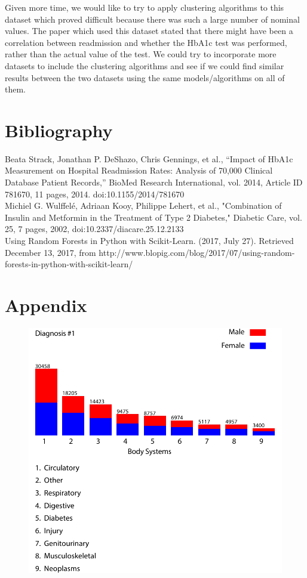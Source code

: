 \documentclass{neu_handout}
\begin{document}
Given more time, we would like to try to apply clustering algorithms to this dataset which proved difficult because there was such a large number of nominal values. The paper which used this dataset stated that there might have been a correlation between readmission and whether the HbA1c test was performed, rather than the actual value of the test. We could try to incorporate more datasets to include the clustering algorithms and see if we could find similar results between the two datasets using the same models/algorithms on all of them. 
\pagebreak

\section*{Bibliography}

Beata Strack, Jonathan P. DeShazo, Chris Gennings, et al., “Impact of HbA1c Measurement on Hospital Readmission Rates: Analysis of 70,000 Clinical Database Patient Records,” BioMed Research International, vol. 2014, Article ID 781670, 11 pages, 2014. doi:10.1155/2014/781670 \\

Michiel G. Wulffelé, Adriaan Kooy, Philippe Lehert, et al., "Combination of Insulin and Metformin in the Treatment of Type 2 Diabetes," Diabetic Care, vol. 25, 7 pages, 2002, doi:10.2337/diacare.25.12.2133 \\

Using Random Forests in Python with Scikit-Learn. (2017, July 27). Retrieved December 13, 2017, from http://www.blopig.com/blog/2017/07/using-random-forests-in-python-with-scikit-learn/

\pagebreak

\section*{Appendix}
\begin{figure}[H]
\centering
\includegraphics[width=0.60\linewidth]{Diag_1.pdf}
\end{figure}
\end{document}
